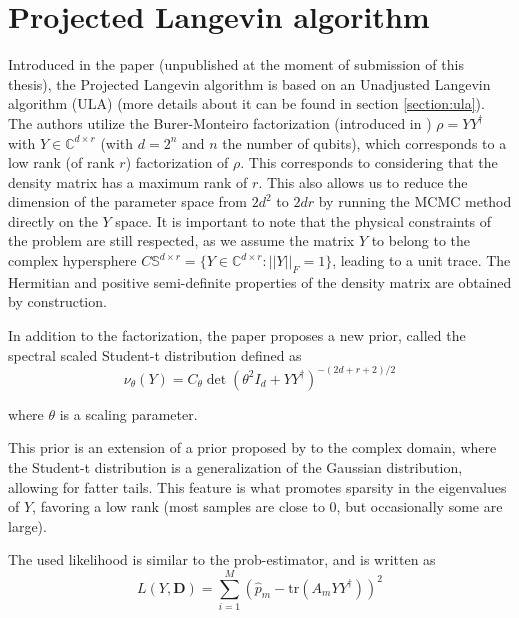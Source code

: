\documentclass[12pt]{memoir}
\newcommand{\tr}{\text{tr}}
\newcommand{\mb}{\mathbf}
\begin{document}
\newpage

\section{Projected Langevin algorithm}\label{section:projected-langevin}


Introduced in the \cite{meth:bayesian:Langevin:ACMT2024} paper (unpublished at the moment of submission of this thesis), the Projected Langevin algorithm is based on an Unadjusted Langevin algorithm (ULA) (more details about it can be found in section \ref{section:ula}). The authors utilize the Burer-Monteiro factorization (introduced in \cite{proj-langevin:Burer2003}) $\rho = Y Y^\dagger$ with $Y \in \mathbb{C}^{d \times r}$ (with $d=2^n$ and $n$ the number of qubits), which corresponds to a low rank (of rank $r$) factorization of $\rho$. This corresponds to considering that the density matrix has a maximum rank of $r$. This also allows us to reduce the dimension of the parameter space from $2d^2$ to $2dr$ by running the MCMC method directly on the $Y$ space. It is important to note that the physical constraints of the problem are still respected, as we assume the matrix $Y$ to belong to the complex hypersphere $C \mathbb{S}^{d\times r} = \{ Y \in \mathbb{C}^{d\times r}: ||Y||_F = 1\}$, leading to a unit trace. The Hermitian and positive semi-definite properties of the density matrix are obtained by construction.\medbreak


In addition to the factorization, the paper proposes a new prior, called the spectral scaled Student-t distribution defined as
\begin{equation}    
\nu_{\theta} (Y) = C_\theta \det(\theta^2I_d + YY^\dagger)^{-(2d+r+2)/2}
\end{equation}

where $\theta$ is a scaling parameter.\medbreak


This prior is an extension of a prior proposed by \cite{Dal20} to the complex domain, where the Student-t distribution is a generalization of the Gaussian distribution, allowing for fatter tails. This feature is what promotes sparsity in the eigenvalues of $Y$, favoring a low rank (most samples are close to 0, but occasionally some are large).\medbreak

The used likelihood is similar to the prob-estimator, and is written as
\begin{equation}
L(Y, \mb D) = \sum^{M}_{i=1} (\hat p_m - \tr(A_mYY^\dagger))^2
\end{equation}
\end{document}
